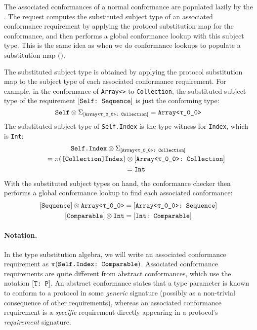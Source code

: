 \documentclass[../generics]{subfiles}
\begin{document}
The associated conformances of a normal conformance are populated lazily by the . The request computes the substituted subject type of an associated conformance requirement by applying the protocol substitution map for the conformance, and then performs a global conformance lookup with this subject type. This is the same idea as when we do conformance lookups to populate a substitution map ().

The substituted subject type is obtained by applying the protocol substitution map to the subject type of each associated conformance requirement. For example, in the conformance of \texttt{Array<>} to \texttt{Collection}, the substituted subject type of the requirement $[\texttt{Self:~Sequence}]$ is just the conforming type:
\[
\texttt{Self} \otimes \Sigma_{[\texttt{Array<\texttt{$\uptau$\_0\_0}>:~Collection}]} = \texttt{Array<\texttt{$\uptau$\_0\_0}>}
\]
The substituted subject type of \verb|Self.Index| is the type witness for \verb|Index|, which is \verb|Int|:
\begin{gather*}
\texttt{Self.Index} \otimes \Sigma_{[\texttt{Array<\texttt{$\uptau$\_0\_0}>:~Collection}]}\\
\qquad {} = \pi(\texttt{[Collection]Index}) \otimes [\texttt{Array<\texttt{$\uptau$\_0\_0}>:~Collection}]\\
\qquad {} = \texttt{Int}
\end{gather*}
With the substituted subject types on hand, the conformance checker then performs a global conformance lookup to find each associated conformance:
\begin{gather*}
\protosym{Sequence} \otimes \texttt{Array<\ttgp{0}{0}>} = \ConfReq{Array<\ttgp{0}{0}>}{Sequence}\\
\protosym{Comparable} \otimes \texttt{Int} = \ConfReq{Int}{Comparable}
\end{gather*}
\paragraph{Notation.} In the type substitution algebra, we will write an associated conformance requirement as $\pi(\texttt{Self.Index:~Comparable})$. Associated conformance requirements are quite different from abstract conformances, which use the notation $[\texttt{T:~P}]$. An abstract conformance states that a type parameter is known to conform to a protocol in some \emph{generic} signature (possibly as a non-trivial consequence of other requirements), whereas an associated conformance requirement is a \emph{specific} requirement directly appearing in a protocol's \emph{requirement} signature.
\end{document}
